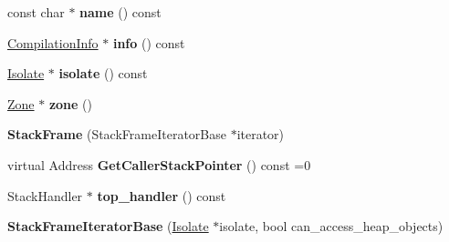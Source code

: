 \begin{DoxyCompactItemize}
\item 
\hypertarget{classv8_1_1internal_1_1_b_a_s_e___e_m_b_e_d_d_e_d_aa902f4e67ef51143901a2fced6f4a23f}{}const char $\ast$ {\bfseries name} () const \label{classv8_1_1internal_1_1_b_a_s_e___e_m_b_e_d_d_e_d_aa902f4e67ef51143901a2fced6f4a23f}

\item 
\hypertarget{classv8_1_1internal_1_1_b_a_s_e___e_m_b_e_d_d_e_d_a833b0a16798da46ea7deff29fa4cc98b}{}\hyperlink{classv8_1_1internal_1_1_compilation_info}{Compilation\+Info} $\ast$ {\bfseries info} () const \label{classv8_1_1internal_1_1_b_a_s_e___e_m_b_e_d_d_e_d_a833b0a16798da46ea7deff29fa4cc98b}

\item 
\hypertarget{classv8_1_1internal_1_1_b_a_s_e___e_m_b_e_d_d_e_d_aafca7727b44748c75ff39a90282dfb8d}{}\hyperlink{classv8_1_1internal_1_1_isolate}{Isolate} $\ast$ {\bfseries isolate} () const \label{classv8_1_1internal_1_1_b_a_s_e___e_m_b_e_d_d_e_d_aafca7727b44748c75ff39a90282dfb8d}

\item 
\hypertarget{classv8_1_1internal_1_1_b_a_s_e___e_m_b_e_d_d_e_d_a24414c9eceec7debdc37dfbbf7265db0}{}\hyperlink{classv8_1_1internal_1_1_zone}{Zone} $\ast$ {\bfseries zone} ()\label{classv8_1_1internal_1_1_b_a_s_e___e_m_b_e_d_d_e_d_a24414c9eceec7debdc37dfbbf7265db0}

\item 
\hypertarget{classv8_1_1internal_1_1_b_a_s_e___e_m_b_e_d_d_e_d_a00c5db928a07713ce350f53605d86d4b}{}{\bfseries Stack\+Frame} (Stack\+Frame\+Iterator\+Base $\ast$iterator)\label{classv8_1_1internal_1_1_b_a_s_e___e_m_b_e_d_d_e_d_a00c5db928a07713ce350f53605d86d4b}

\item 
\hypertarget{classv8_1_1internal_1_1_b_a_s_e___e_m_b_e_d_d_e_d_af15d7f32ff67c77a54e2b19e60304315}{}virtual Address {\bfseries Get\+Caller\+Stack\+Pointer} () const =0\label{classv8_1_1internal_1_1_b_a_s_e___e_m_b_e_d_d_e_d_af15d7f32ff67c77a54e2b19e60304315}

\item 
\hypertarget{classv8_1_1internal_1_1_b_a_s_e___e_m_b_e_d_d_e_d_aaf5fc66d4ca76820a9700a7997b03335}{}Stack\+Handler $\ast$ {\bfseries top\+\_\+handler} () const \label{classv8_1_1internal_1_1_b_a_s_e___e_m_b_e_d_d_e_d_aaf5fc66d4ca76820a9700a7997b03335}

\item 
\hypertarget{classv8_1_1internal_1_1_b_a_s_e___e_m_b_e_d_d_e_d_aa04ed24662679f93f257c6a1fc6efa41}{}{\bfseries Stack\+Frame\+Iterator\+Base} (\hyperlink{classv8_1_1internal_1_1_isolate}{Isolate} $\ast$isolate, bool can\+\_\+access\+\_\+heap\+\_\+objects)\label{classv8_1_1internal_1_1_b_a_s_e___e_m_b_e_d_d_e_d_aa04ed24662679f93f257c6a1fc6efa41}


\end{DoxyCompactItemize}

